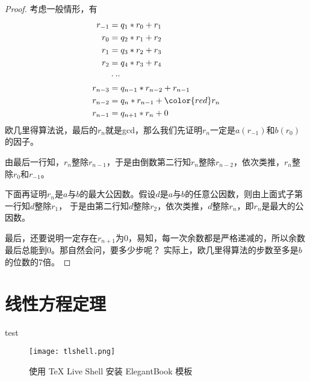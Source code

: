 \begin{proof}
	考虑一般情形，有
	\begin{align*}
	r_{-1} &= q_1*r_0 + r_1 \\
	r_0 &= q_2*r_1 + r_2 \\
	r_1 &= q_3 * r_2 + r_3 \\
	r_2 &= q_4 * r_3 + r_4 \\
 	&\cdot \cdot \cdot\\
	r_{n-3} &= q_{n-1}*r_{n-2} + r_{n-1} \\
	r_{n-2} &= q_{n} * r_{n-1} + {\color{red} r_n} \\
	r_{n-1} &= q_{n+1} * r_n + 0 \\
	\end{align*}
	欧几里得算法说，最后的$r_n$就是gcd，那么我们先证明$r_n$一定是$a(r_{-1})$和$b(r_0)$的因子。
	
	由最后一行知，$r_n$整除$r_{n-1}$，于是由倒数第二行知$r_n$整除$r_{n-2}$，依次类推，$r_n$整除$r_{0}$和$r_{-1}$。
	
	下面再证明$r_n$是$a$与$b$的{\heiti 最大}公因数。假设$d$是$a$与$b$的任意公因数，则由上面式子第一行知$d$整除$r_1$，
	于是由第二行知$d$整除$r_2$，依次类推，$d$整除$r_n$，即$r_n$是最大的公因数。
	
	最后，还要说明一定存在$r_{n+1}$为0，易知，每一次余数都是严格递减的，所以余数最后总能到0。那自然会问，要多少步呢？
	实际上，{\heiti 欧几里得算法的步数至多是$b$的位数的7倍}。
\end{proof}



\section{线性方程定理}
test




























\begin{figure}[htbp]
\centering
\texttt{[image: tlshell.png]}
\caption{使用 \TeX{} Live Shell 安装 ElegantBook 模板}
\end{figure}



